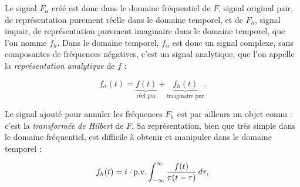 \begin{figure}[h]
    \centering

    \label{fig:analytic-representation}
\end{figure}


Le signal $F_{\alpha}$ créé est donc dans le domaine fréquentiel de $F$, signal original pair, de représentation purement réelle dans le domaine temporel, et de $F_h$, signal impair, de représentation purement imaginaire dans le domaine temporel, que l'on nomme $f_h$. Dans le domaine temporel, $f_{\alpha}$ est donc un signal complexe, sans composantes de fréquences négatives, c'est un signal analytique, que l'on appelle la \textit{représentation analytique} de $f$ :

\begin{equation}
    f_{\alpha}(t) = \underbrace{f(t)}_\text{réel pur} + \underbrace{f_h(t)}_\text{imaginaire pur}.
\end{equation}

Le signal ajouté pour annuler les fréquences $F_h$ est par ailleurs un objet connu : c'est la \textit{transformée de Hilbert} de $F$. Sa représentation, bien que très simple dans le domaine fréquentiel, est difficile à obtenir et manipuler dans le domaine temporel :

\begin{equation}
    f_h(t) = i \cdot \textnormal{p.v.} \int_{-\infty}^{\infty} \frac{f(t)}{\pi(t-\tau)} \,d\tau,
\end{equation}

